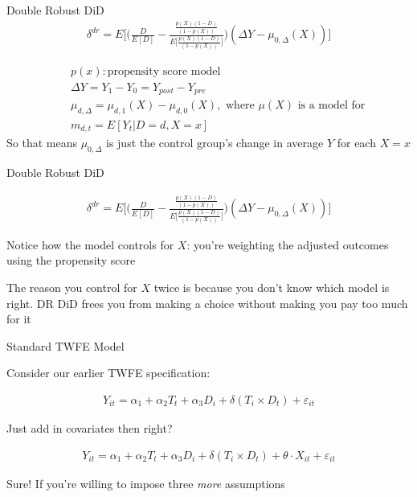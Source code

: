 \documentclass{beamer}
\begin{document}
\begin{frame}{Double Robust DiD}
\begin{eqnarray*}
\delta^{dr} = E \bigg [ \bigg ( \frac{D}{E[D]} -\frac{ \frac{p(X)(1-D)}{(1-p(X))} }{E \bigg [\frac{p(X)(1-D)}{(1-p(X))} \bigg ]} \bigg  )( \Delta Y - \mu_{0,\Delta}(X)) \bigg ]
\end{eqnarray*}

\begin{eqnarray*}
&&p(x): \text{propensity score model} \\
&& \Delta Y = Y_1 - Y_0 = Y_{post} - Y_{pre} \\
&& \mu_{d,\Delta} = \mu_{d,1}(X) - \mu_{d,0}(X), \text{ where } \mu(X) \text{ is a model for} \\
&& m_{d,t} = E[Y_t|D=d,X=x]
\end{eqnarray*}So that means $\mu_{0,\Delta}$ is just the control group's change in average $Y$ for each $X=x$

\end{frame}

\begin{frame}{Double Robust DiD}

\begin{eqnarray*}
\delta^{dr} = E \bigg [ \bigg ( \frac{D}{E[D]} -\frac{ \frac{p(X)(1-D)}{(1-p(X))} }{E \bigg [\frac{p(X)(1-D)}{(1-p(X))} \bigg ]} \bigg  )( \Delta Y - \mu_{0,\Delta}(X)) \bigg ]
\end{eqnarray*}

Notice how the model controls for $X$: you're weighting the adjusted outcomes using the propensity score

\bigskip

The reason you control for $X$ twice is because you don't know which model is right.  DR DiD frees you from making a choice without making you pay too much for it


\end{frame}



\begin{frame}{Standard TWFE Model}

Consider our earlier TWFE specification:

\begin{eqnarray*}
Y_{it} = \alpha_1  + \alpha_2 T_t + \alpha_3 D_i +  \delta (T_i \times D_t)  + \varepsilon_{it}
\end{eqnarray*}

\bigskip

Just add in covariates then right?

\begin{eqnarray*}
Y_{it} = \alpha_1  + \alpha_2 T_t + \alpha_3 D_i  + \delta (T_i \times D_t) + \theta \cdot X_{it} + \varepsilon_{it}
\end{eqnarray*}

Sure! If you're willing to impose three \emph{more} assumptions

\end{frame}
\end{document}
